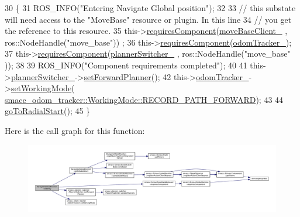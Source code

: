 \begin{DoxyCode}
30   \{
31     ROS\_INFO(\textcolor{stringliteral}{"Entering Navigate Global position"});
32 
33     \textcolor{comment}{// this substate will need access to the "MoveBase" resource or plugin. In this line}
34     \textcolor{comment}{// you get the reference to this resource.}
35     this->\hyperlink{classsmacc_1_1SmaccSubStateBehavior_a4d25c4ba8ec01c489df172a71bb1c37d}{requiresComponent}(\hyperlink{classNavigateGlobalPosition_a1fdbaa1d3924509637a53b991d195670}{moveBaseClient\_} , ros::NodeHandle(\textcolor{stringliteral}{"move\_base"}))
      ;
36     this->\hyperlink{classsmacc_1_1SmaccSubStateBehavior_a4d25c4ba8ec01c489df172a71bb1c37d}{requiresComponent}(\hyperlink{classNavigateGlobalPosition_a7bec01b571fac3c04008b7fab84dfb3d}{odomTracker\_});
37     this->\hyperlink{classsmacc_1_1SmaccSubStateBehavior_a4d25c4ba8ec01c489df172a71bb1c37d}{requiresComponent}(\hyperlink{classNavigateGlobalPosition_a544cf45f4233da0ebaf33813730143f9}{plannerSwitcher\_} , ros::NodeHandle(\textcolor{stringliteral}{"move\_base"}
      ));   
38 
39     ROS\_INFO(\textcolor{stringliteral}{"Component requirements completed"});
40 
41     this->\hyperlink{classNavigateGlobalPosition_a544cf45f4233da0ebaf33813730143f9}{plannerSwitcher\_}->\hyperlink{classsmacc__planner__switcher_1_1PlannerSwitcher_a6510ee1f23243ee725c61e590354d3bc}{setForwardPlanner}();
42     this->\hyperlink{classNavigateGlobalPosition_a7bec01b571fac3c04008b7fab84dfb3d}{odomTracker\_}->\hyperlink{classsmacc__odom__tracker_1_1OdomTracker_a38fbca999297c46dc95628cc60851a45}{setWorkingMode}(
      \hyperlink{namespacesmacc__odom__tracker_ade9730dd5cc10ccfad9362176cf46c33a989d06a586bcf9520889228da7faa643}{smacc\_odom\_tracker::WorkingMode::RECORD\_PATH\_FORWARD});
43 
44     \hyperlink{classNavigateGlobalPosition_a5181e70601da336334f25a95840fd878}{goToRadialStart}(); 
45   \}
\end{DoxyCode}


Here is the call graph for this function\+:
\nopagebreak
\begin{figure}[H]
\begin{center}
\leavevmode
\includegraphics[width=350pt]{classNavigateGlobalPosition_a80962ce5bba51285565e360872f58c47_cgraph}
\end{center}
\end{figure}


